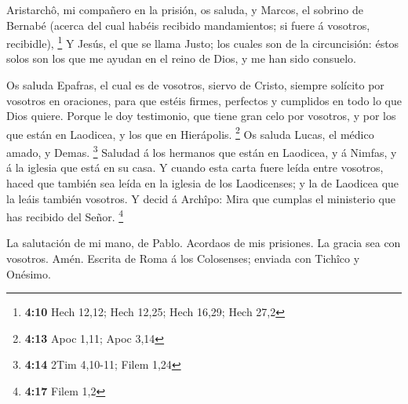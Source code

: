  Aristarchô, mi compañero en la prisión, os saluda, y
Marcos, el sobrino de Bernabé (acerca del cual habéis recibido
mandamientos; si fuere á vosotros, recibidle), \footnote{\textbf{4:10}
  Hech 12,12; Hech 12,25; Hech 16,29; Hech 27,2}  Y
Jesús, el que se llama Justo; los cuales son de la circuncisión: éstos
solos son los que me ayudan en el reino de Dios, y me han sido consuelo.

 Os saluda Epafras, el cual es de vosotros, siervo de
Cristo, siempre solícito por vosotros en oraciones, para que estéis
firmes, perfectos y cumplidos en todo lo que Dios quiere.
 Porque le doy testimonio, que tiene gran celo por
vosotros, y por los que están en Laodicea, y los que en Hierápolis.
\footnote{\textbf{4:13} Apoc 1,11; Apoc 3,14}  Os saluda
Lucas, el médico amado, y Demas. \footnote{\textbf{4:14} 2Tim 4,10-11;
  Filem 1,24}  Saludad á los hermanos que están en
Laodicea, y á Nimfas, y á la iglesia que está en su casa.
 Y cuando esta carta fuere leída entre vosotros, haced
que también sea leída en la iglesia de los Laodicenses; y la de Laodicea
que la leáis también vosotros.  Y decid á Archîpo: Mira
que cumplas el ministerio que has recibido del Señor. \footnote{\textbf{4:17}
  Filem 1,2}

 La salutación de mi mano, de Pablo. Acordaos de mis
prisiones. La gracia sea con vosotros. Amén. Escrita de Roma á los
Colosenses; enviada con Tichîco y Onésimo.
